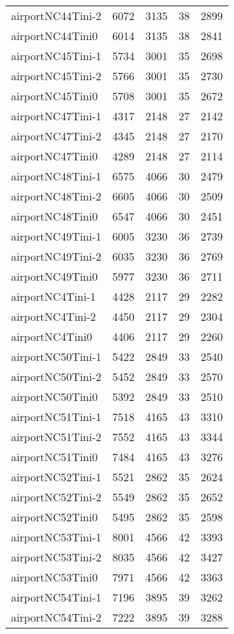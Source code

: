 \documentclass[../../../thesis.tex]{subfiles}
\begin{document}
\begin{longtable}{lrrrr}
airportNC44Tini-2 & 6072 & 3135 & 38 & 2899 \\
airportNC44Tini0 & 6014 & 3135 & 38 & 2841 \\
airportNC45Tini-1 & 5734 & 3001 & 35 & 2698 \\
airportNC45Tini-2 & 5766 & 3001 & 35 & 2730 \\
airportNC45Tini0 & 5708 & 3001 & 35 & 2672 \\
airportNC47Tini-1 & 4317 & 2148 & 27 & 2142 \\
airportNC47Tini-2 & 4345 & 2148 & 27 & 2170 \\
airportNC47Tini0 & 4289 & 2148 & 27 & 2114 \\
airportNC48Tini-1 & 6575 & 4066 & 30 & 2479 \\
airportNC48Tini-2 & 6605 & 4066 & 30 & 2509 \\
airportNC48Tini0 & 6547 & 4066 & 30 & 2451 \\
airportNC49Tini-1 & 6005 & 3230 & 36 & 2739 \\
airportNC49Tini-2 & 6035 & 3230 & 36 & 2769 \\
airportNC49Tini0 & 5977 & 3230 & 36 & 2711 \\
airportNC4Tini-1 & 4428 & 2117 & 29 & 2282 \\
airportNC4Tini-2 & 4450 & 2117 & 29 & 2304 \\
airportNC4Tini0 & 4406 & 2117 & 29 & 2260 \\
airportNC50Tini-1 & 5422 & 2849 & 33 & 2540 \\
airportNC50Tini-2 & 5452 & 2849 & 33 & 2570 \\
airportNC50Tini0 & 5392 & 2849 & 33 & 2510 \\
airportNC51Tini-1 & 7518 & 4165 & 43 & 3310 \\
airportNC51Tini-2 & 7552 & 4165 & 43 & 3344 \\
airportNC51Tini0 & 7484 & 4165 & 43 & 3276 \\
airportNC52Tini-1 & 5521 & 2862 & 35 & 2624 \\
airportNC52Tini-2 & 5549 & 2862 & 35 & 2652 \\
airportNC52Tini0 & 5495 & 2862 & 35 & 2598 \\
airportNC53Tini-1 & 8001 & 4566 & 42 & 3393 \\
airportNC53Tini-2 & 8035 & 4566 & 42 & 3427 \\
airportNC53Tini0 & 7971 & 4566 & 42 & 3363 \\
airportNC54Tini-1 & 7196 & 3895 & 39 & 3262 \\
airportNC54Tini-2 & 7222 & 3895 & 39 & 3288 \\

\end{longtable}
\end{document}
